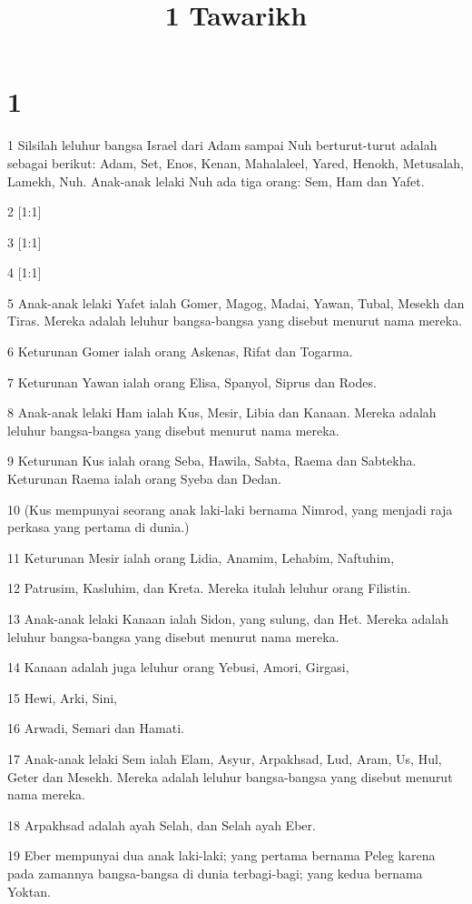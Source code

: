 

\title{1 Tawarikh}


\chapter{1}

\par 1 Silsilah leluhur bangsa Israel dari Adam sampai Nuh berturut-turut adalah sebagai berikut: Adam, Set, Enos, Kenan, Mahalaleel, Yared, Henokh, Metusalah, Lamekh, Nuh. Anak-anak lelaki Nuh ada tiga orang: Sem, Ham dan Yafet.
\par 2 [1:1]
\par 3 [1:1]
\par 4 [1:1]
\par 5 Anak-anak lelaki Yafet ialah Gomer, Magog, Madai, Yawan, Tubal, Mesekh dan Tiras. Mereka adalah leluhur bangsa-bangsa yang disebut menurut nama mereka.
\par 6 Keturunan Gomer ialah orang Askenas, Rifat dan Togarma.
\par 7 Keturunan Yawan ialah orang Elisa, Spanyol, Siprus dan Rodes.
\par 8 Anak-anak lelaki Ham ialah Kus, Mesir, Libia dan Kanaan. Mereka adalah leluhur bangsa-bangsa yang disebut menurut nama mereka.
\par 9 Keturunan Kus ialah orang Seba, Hawila, Sabta, Raema dan Sabtekha. Keturunan Raema ialah orang Syeba dan Dedan.
\par 10 (Kus mempunyai seorang anak laki-laki bernama Nimrod, yang menjadi raja perkasa yang pertama di dunia.)
\par 11 Keturunan Mesir ialah orang Lidia, Anamim, Lehabim, Naftuhim,
\par 12 Patrusim, Kasluhim, dan Kreta. Mereka itulah leluhur orang Filistin.
\par 13 Anak-anak lelaki Kanaan ialah Sidon, yang sulung, dan Het. Mereka adalah leluhur bangsa-bangsa yang disebut menurut nama mereka.
\par 14 Kanaan adalah juga leluhur orang Yebusi, Amori, Girgasi,
\par 15 Hewi, Arki, Sini,
\par 16 Arwadi, Semari dan Hamati.
\par 17 Anak-anak lelaki Sem ialah Elam, Asyur, Arpakhsad, Lud, Aram, Us, Hul, Geter dan Mesekh. Mereka adalah leluhur bangsa-bangsa yang disebut menurut nama mereka.
\par 18 Arpakhsad adalah ayah Selah, dan Selah ayah Eber.
\par 19 Eber mempunyai dua anak laki-laki; yang pertama bernama Peleg karena pada zamannya bangsa-bangsa di dunia terbagi-bagi; yang kedua bernama Yoktan.
